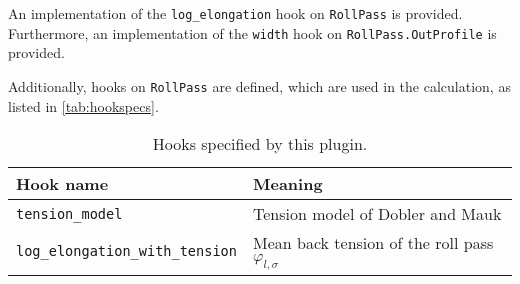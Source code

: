 \documentclass[11pt]{PyRollDocs}
\begin{document}
    An implementation of the \lstinline{log_elongation} hook on \lstinline{RollPass} is provided.
    Furthermore, an implementation of the \lstinline{width} hook on \lstinline{RollPass.OutProfile} is provided.

    Additionally, hooks on \lstinline{RollPass} are defined, which are used in the calculation, as listed in \autoref{tab:hookspecs}.

    \begin{table}
        \centering
        \caption{Hooks specified by this plugin.}
        \label{tab:hookspecs}
        \begin{tabular}{ll}
            \toprule
            Hook name                               & Meaning                                                 \\
            \midrule
            \texttt{tension\_model}                 & Tension model of Dobler and Mauk                        \\
            \texttt{log\_elongation\_with\_tension} & Mean back tension of the roll pass $\varphi_{l,\sigma}$ \\
            \bottomrule
        \end{tabular}
    \end{table}

    \printbibliography
\end{document}
